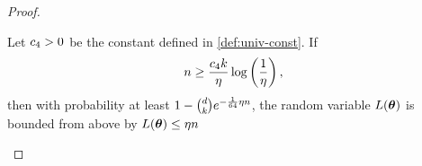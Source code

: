 \begin{proof}
%
\begin{lemma}
\label{lemma:pf:lemma:concentration-ineq:noiseless:small:mismatches}
%
Let
\(  c_{4} > 0  \)
be the constant defined in \DEFINITION \ref{def:univ-const}.
If
\begin{gather}
  n
  \geq
  \frac{c_{4} k}{\eta} \log \left( \frac{1}{\eta} \right)
,\end{gather}
then with probability at least \(  1 - \binom{d}{k} e^{-\frac{1}{64} \eta n}  \), the random variable \(  \LRVX{\thetaX}  \) is bounded from above by
\(  \LRVX{\thetaX} \leq \nuX \m  \)

\end{lemma}
\end{proof}
